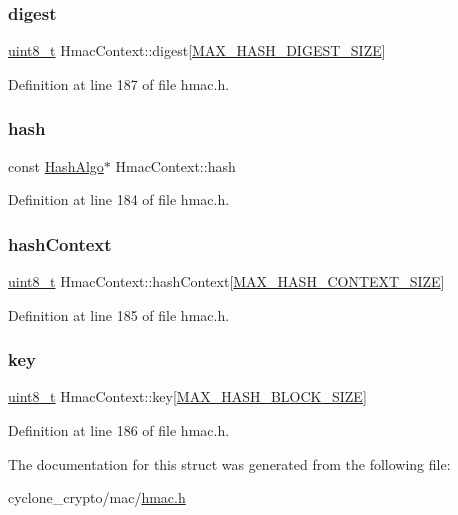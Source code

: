 \subsubsection{\texorpdfstring{digest}{digest}}
{\footnotesize\ttfamily \hyperlink{stdint_8h_aba7bc1797add20fe3efdf37ced1182c5}{uint8\+\_\+t} Hmac\+Context\+::digest\mbox{[}\hyperlink{cyclone__crypto_2core_2crypto_8h_ac6e85336237dcdf8efb9280b84e4ffd6}{M\+A\+X\+\_\+\+H\+A\+S\+H\+\_\+\+D\+I\+G\+E\+S\+T\+\_\+\+S\+I\+ZE}\mbox{]}}



Definition at line 187 of file hmac.\+h.

\mbox{\label{structHmacContext_a2ef1bb0b311b25ed49f6a93f6c005923}} 
\subsubsection{\texorpdfstring{hash}{hash}}
{\footnotesize\ttfamily const \hyperlink{structHashAlgo}{Hash\+Algo}$\ast$ Hmac\+Context\+::hash}



Definition at line 184 of file hmac.\+h.

\mbox{\label{structHmacContext_a42051eba96f3c98ad95efba44e54032a}} 
\subsubsection{\texorpdfstring{hash\+Context}{hashContext}}
{\footnotesize\ttfamily \hyperlink{stdint_8h_aba7bc1797add20fe3efdf37ced1182c5}{uint8\+\_\+t} Hmac\+Context\+::hash\+Context\mbox{[}\hyperlink{cyclone__crypto_2core_2crypto_8h_a17bccd72e42ecb723e28314749fb1638}{M\+A\+X\+\_\+\+H\+A\+S\+H\+\_\+\+C\+O\+N\+T\+E\+X\+T\+\_\+\+S\+I\+ZE}\mbox{]}}



Definition at line 185 of file hmac.\+h.

\mbox{\label{structHmacContext_a7c5f7de439ad6d53360bbc2d076c931f}} 
\subsubsection{\texorpdfstring{key}{key}}
{\footnotesize\ttfamily \hyperlink{stdint_8h_aba7bc1797add20fe3efdf37ced1182c5}{uint8\+\_\+t} Hmac\+Context\+::key\mbox{[}\hyperlink{cyclone__crypto_2core_2crypto_8h_ae0b1ccdf219b4a384f11d5218755a9ab}{M\+A\+X\+\_\+\+H\+A\+S\+H\+\_\+\+B\+L\+O\+C\+K\+\_\+\+S\+I\+ZE}\mbox{]}}



Definition at line 186 of file hmac.\+h.



The documentation for this struct was generated from the following file\+:\begin{DoxyCompactItemize}
\item 
cyclone\+\_\+crypto/mac/\hyperlink{hmac_8h}{hmac.\+h}\end{DoxyCompactItemize}
